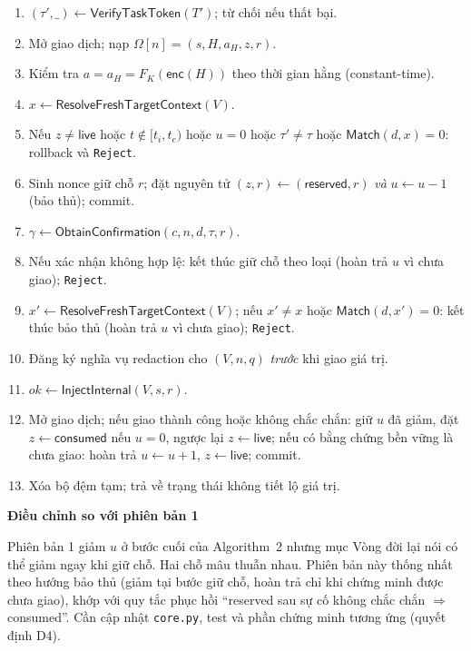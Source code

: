 \documentclass[11pt,a4paper]{article}
\newcommand{\code}[1]{\texttt{\small #1}}
\newenvironment{callout}[1]
  {\par\vspace{0.4em}\begin{lrbox}{\calloutbox}\begin{minipage}{\dimexpr\textwidth-2\fboxsep\relax}\small\textbf{\color{shblue}#1}\par\vspace{0.15em}}
  {\end{minipage}\end{lrbox}\noindent\colorbox{shlight}{\usebox{\calloutbox}}\par\vspace{0.4em}}
\begin{document}
\begin{enumerate}
  \item $(\tau', \_) \leftarrow \mathsf{VerifyTaskToken}(T')$; từ chối nếu thất bại.
  \item Mở giao dịch; nạp $\Omega[n] = (s, H, a_H, z, r)$.
  \item Kiểm tra $a = a_H = F_K(\mathsf{enc}(H))$ theo thời gian hằng (constant-time).
  \item $x \leftarrow \mathsf{ResolveFreshTargetContext}(V)$.
  \item Nếu $z \ne \mathsf{live}$ hoặc $t \notin [t_i, t_e)$ hoặc $u = 0$ hoặc $\tau' \ne \tau$ hoặc
        $\mathsf{Match}(d, x) = 0$: rollback và \code{Reject}.
  \item Sinh nonce giữ chỗ $r$; đặt nguyên tử $(z, r) \leftarrow (\mathsf{reserved}, r)$ \emph{và} $u \leftarrow u - 1$ (bảo thủ); commit.
  \item $\gamma \leftarrow \mathsf{ObtainConfirmation}(c, n, d, \tau, r)$.
  \item Nếu xác nhận không hợp lệ: kết thúc giữ chỗ theo loại (hoàn trả $u$ vì chưa giao); \code{Reject}.
  \item $x' \leftarrow \mathsf{ResolveFreshTargetContext}(V)$; nếu $x' \ne x$ hoặc $\mathsf{Match}(d, x') = 0$:
        kết thúc bảo thủ (hoàn trả $u$ vì chưa giao); \code{Reject}.
  \item Đăng ký nghĩa vụ redaction cho $(V, n, q)$ \emph{trước} khi giao giá trị.
  \item $ok \leftarrow \mathsf{InjectInternal}(V, s, r)$.
  \item Mở giao dịch; nếu giao thành công hoặc không chắc chắn: giữ $u$ đã giảm, đặt $z \leftarrow \mathsf{consumed}$ nếu $u = 0$,
        ngược lại $z \leftarrow \mathsf{live}$; nếu có bằng chứng bền vững là chưa giao: hoàn trả $u \leftarrow u+1$, $z \leftarrow \mathsf{live}$; commit.
  \item Xóa bộ đệm tạm; trả về trạng thái không tiết lộ giá trị.
\end{enumerate}

\begin{callout}{Điều chỉnh so với phiên bản 1}
Phiên bản 1 giảm $u$ ở bước cuối của Algorithm~2 nhưng mục Vòng đời lại nói có thể giảm ngay khi giữ chỗ. Hai chỗ mâu thuẫn nhau.
Phiên bản này thống nhất theo hướng bảo thủ (giảm tại bước giữ chỗ, hoàn trả chỉ khi chứng minh được chưa giao), khớp với quy tắc phục hồi
``reserved sau sự cố không chắc chắn $\Rightarrow$ consumed''. Cần cập nhật \code{core.py}, test và phần chứng minh tương ứng (quyết định D4).
\end{callout}
\end{document}
